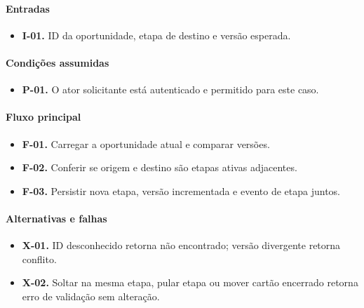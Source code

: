 \documentclass[10pt,a4paper]{article}
\begin{document}
\paragraph{Entradas}

\begin{itemize}

\item \textbf{I-01.} ID da oportunidade, etapa de destino e versão esperada.

\end{itemize}

\paragraph{Condições assumidas}

\begin{itemize}

\item \textbf{P-01.} O ator solicitante está autenticado e permitido para este caso.

\end{itemize}

\paragraph{Fluxo principal}

\begin{itemize}

\item \textbf{F-01.} Carregar a oportunidade atual e comparar versões.

\item \textbf{F-02.} Conferir se origem e destino são etapas ativas adjacentes.

\item \textbf{F-03.} Persistir nova etapa, versão incrementada e evento de etapa juntos.

\end{itemize}

\paragraph{Alternativas e falhas}

\begin{itemize}

\item \textbf{X-01.} ID desconhecido retorna não encontrado; versão divergente retorna conflito.

\item \textbf{X-02.} Soltar na mesma etapa, pular etapa ou mover cartão encerrado retorna erro de validação sem alteração.

\end{itemize}
\end{document}
